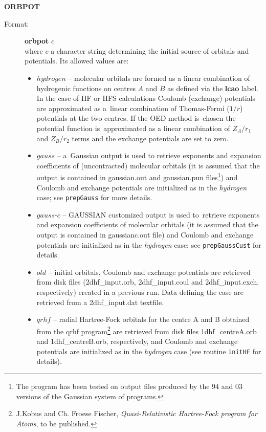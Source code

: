 \documentclass[12pt,a4paper]{article}
\newcommand{\ft}[1]{\texttt{#1}}
\begin{document}
\begin{description}
\item \textbf{ORBPOT}
\begin{description} 
\item[Format:] \textbf{orbpot} $c$\\
  where $c$ a character string determining the initial source of
  orbitals and potentials. Its allowed values are:
\begin{itemize}
\item $hydrogen$ -- molecular orbitals are formed as a linear combination of hydrogenic
  functions on centres $A$ and $B$ as defined via the \textbf{lcao} label. In the case of
  HF or HFS calculations Coulomb (exchange) potentials are approximated as a~linear
  combination of Thomas-Fermi ($1/r$) potentials at the two centres. If the OED method
  is~chosen the potential function is~approximated as a linear combination of $Z_A/r_1$
  and $Z_B/r_2$ terms and the exchange potentials are set to zero.

\item $gauss$ -- a~Gaussian output is used to retrieve exponents and expansion
  coefficients of (uncontracted) molecular orbitals (it is assumed that the output is
  contained in gaussian.out and gaussian.pun files\footnote{The program has been tested on
    output files produced by the 94 and 03 versions of the Gaussian system of programs.})
  and Coulomb and exchange potentials are initialized as in the \textsl{hydrogen} case;
  see \ft{prepGauss} for more details.

\item $gauss$-$c$ -- GAUSSIAN customized output is used to~retrieve exponents
  and expansion coefficients of molecular orbitals (it is assumed that the output is
  contained in gaussianc.out file) and Coulomb and exchange potentials are initialized as
  in the \textsl{hydrogen} case; see \ft{prepGaussCust} for details.

\item $old$ -- initial orbitals, Coulomb and exchange potentials are retrieved from disk
  files (2dhf\_\-input.\-orb, 2dhf\_\-input.\-coul and 2dhf\_input.exch, respectively) created in
  a previous run. Data defining the case are retrieved from a 2dhf\_input.\-dat textfile.

\item $qrhf$ -- radial Hartree-Fock orbitals for the centre A and B obtained from the qrhf
  program\footnote{J.Kobus and Ch. Froese Fischer, \textsl{Quasi-Relativistic Hartree-Fock
      program for Atoms}, to be published.}  are retrieved from disk files
  1dhf\-\_centreA.\-orb and 1dhf\-\_centreB.\-orb, respectively, and Coulomb and exchange
  potentials are initialized as in the \textsl{hydrogen} case (see routine \ft{initHF} for
  details).


\end{itemize}
\end{description}
\end{description}
\end{document}
